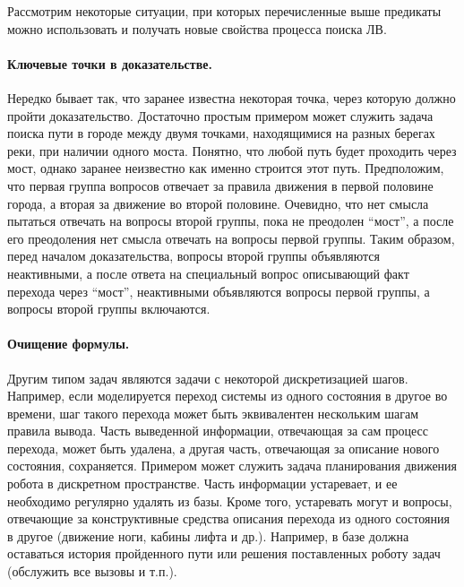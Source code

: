 Рассмотрим некоторые ситуации, при которых перечисленные выше предикаты можно использовать и получать новые свойства процесса поиска ЛВ.

\paragraph{Ключевые точки в доказательстве.} Нередко бывает так, что заранее известна некоторая точка, через которую должно пройти доказательство. Достаточно простым примером может служить задача поиска пути в городе между двумя точками, находящимися на разных берегах реки, при наличии одного моста. Понятно, что любой путь будет проходить через мост, однако заранее неизвестно как именно строится этот путь. Предположим, что первая группа вопросов отвечает за правила движения в первой половине города, а вторая за движение во второй половине. Очевидно, что нет смысла пытаться отвечать на вопросы второй группы, пока не преодолен ``мост'', а после его преодоления нет смысла отвечать на вопросы первой группы. Таким образом, перед началом доказательства, вопросы второй группы объявляются неактивными, а после ответа на специальный вопрос описывающий факт перехода через ``мост'', неактивными объявляются вопросы первой группы, а вопросы второй группы включаются.

\paragraph{Очищение формулы.} Другим типом задач являются задачи с некоторой дискретизацией шагов. Например, если моделируется переход системы из одного состояния в другое во времени, шаг такого перехода может быть эквивалентен нескольким шагам правила вывода. Часть выведенной информации, отвечающая за сам процесс перехода, может быть удалена, а другая часть, отвечающая за описание нового состояния, сохраняется. Примером может служить задача планирования движения робота в дискретном пространстве. Часть информации устаревает, и ее необходимо регулярно удалять из базы. Кроме того, устаревать могут и вопросы, отвечающие за конструктивные средства описания перехода из одного состояния в другое (движение ноги, кабины лифта и др.). Например, в базе должна оставаться история пройденного пути или решения поставленных роботу задач (обслужить все вызовы и т.п.).

